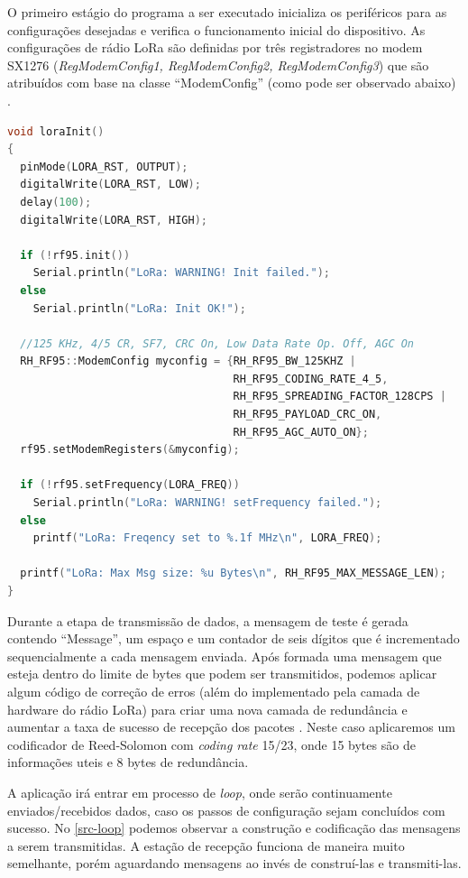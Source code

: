 \documentclass[
	12pt,				%
	openright,			%
	twoside,			%
	a4paper,			%
	english,			%
	french,				%
	spanish,			%
	brazil				%
	]{abntex2}
\newcommand{\quotes}[1]{``#1''}
\begin{document}
O primeiro estágio do programa a ser executado inicializa os periféricos para as configurações desejadas e verifica o funcionamento inicial do dispositivo. As configurações de rádio LoRa são definidas por três registradores no modem SX1276 (\emph{RegModemConfig1, RegModemConfig2, RegModemConfig3}) que são atribuídos com base na classe \quotes{ModemConfig} (como pode ser observado abaixo) \cite{semtech_2016}.

\begin{lstlisting}[language=C++, caption=Inicialização do modem LoRa, label=src-lora-init]
void loraInit()
{
  pinMode(LORA_RST, OUTPUT);
  digitalWrite(LORA_RST, LOW);
  delay(100);
  digitalWrite(LORA_RST, HIGH);

  if (!rf95.init()) 
    Serial.println("LoRa: WARNING! Init failed.");
  else
    Serial.println("LoRa: Init OK!");

  //125 KHz, 4/5 CR, SF7, CRC On, Low Data Rate Op. Off, AGC On  
  RH_RF95::ModemConfig myconfig = {RH_RF95_BW_125KHZ |
                                   RH_RF95_CODING_RATE_4_5,
                                   RH_RF95_SPREADING_FACTOR_128CPS |
                                   RH_RF95_PAYLOAD_CRC_ON,
                                   RH_RF95_AGC_AUTO_ON}; 
  rf95.setModemRegisters(&myconfig);

  if (!rf95.setFrequency(LORA_FREQ))
    Serial.println("LoRa: WARNING! setFrequency failed.");
  else
    printf("LoRa: Freqency set to %.1f MHz\n", LORA_FREQ);

  printf("LoRa: Max Msg size: %u Bytes\n", RH_RF95_MAX_MESSAGE_LEN); 
}
\end{lstlisting}

Durante a etapa de transmissão de dados, a mensagem de teste é gerada contendo \quotes{Message}, um espaço e um contador de seis dígitos que é incrementado sequencialmente a cada mensagem enviada. Após formada uma mensagem que esteja dentro do limite de bytes que podem ser transmitidos, podemos aplicar algum código de correção de erros (além do implementado pela camada de hardware do rádio LoRa) para criar uma nova camada de redundância e aumentar a taxa de sucesso de recepção dos pacotes \cite{yazdani_2021}. Neste caso aplicaremos um codificador de Reed-Solomon com \emph{coding rate} 15/23, onde 15 bytes são de informações uteis e 8 bytes de redundância.

A aplicação irá entrar em processo de \emph{loop}, onde serão continuamente  enviados/recebidos dados, caso os passos de configuração sejam concluídos com sucesso. No \autoref{src-loop} podemos observar a construção e codificação das mensagens a serem transmitidas. A estação de recepção funciona de maneira muito semelhante, porém aguardando mensagens ao invés de construí-las e transmiti-las. 
\end{document}
